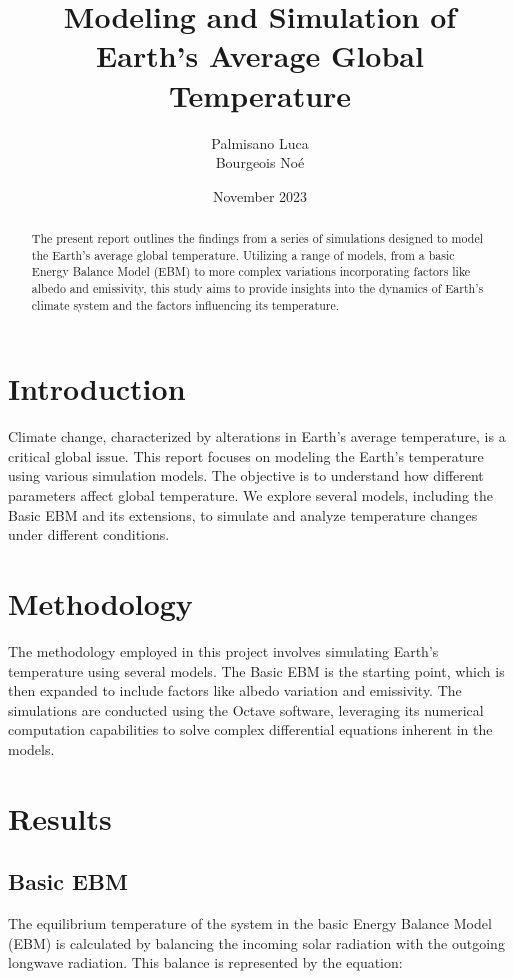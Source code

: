 \documentclass[12pt]{article}
\title{Modeling and Simulation of Earth's Average Global Temperature}
\author{Palmisano Luca \\ Bourgeois Noé}
\date{November 2023}
\begin{document}
\maketitle

\begin{abstract}
\noindent
The present report outlines the findings from a series of simulations designed to model the Earth's average global temperature. Utilizing a range of models, from a basic Energy Balance Model (EBM) to more complex variations incorporating factors like albedo and emissivity, this study aims to provide insights into the dynamics of Earth's climate system and the factors influencing its temperature.
\end{abstract}

\section{Introduction}
Climate change, characterized by alterations in Earth's average temperature, is a critical global issue. This report focuses on modeling the Earth's temperature using various simulation models. The objective is to understand how different parameters affect global temperature. We explore several models, including the Basic EBM and its extensions, to simulate and analyze temperature changes under different conditions.

\section{Methodology}
The methodology employed in this project involves simulating Earth's temperature using several models. The Basic EBM is the starting point, which is then expanded to include factors like albedo variation and emissivity. The simulations are conducted using the Octave software, leveraging its numerical computation capabilities to solve complex differential equations inherent in the models.

\section{Results}

\subsection{Basic EBM}
The equilibrium temperature of the system in the basic Energy Balance Model (EBM) is calculated by balancing the incoming solar radiation with the outgoing longwave radiation. This balance is represented by the equation:
\end{document}
